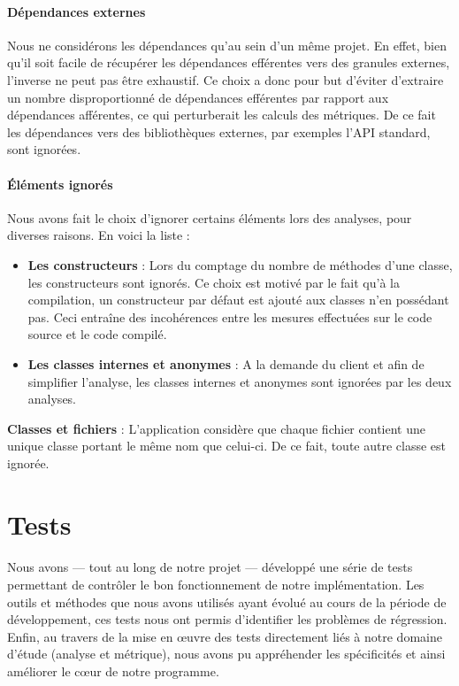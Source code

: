 \documentclass{scrartcl}
\begin{document}
        \paragraph{Dépendances externes}Nous ne considérons les dépendances qu'au sein d'un même projet. En effet, bien qu'il soit facile de récupérer les dépendances efférentes vers des granules externes, l'inverse ne peut pas être exhaustif. Ce choix a donc pour but d'éviter d'extraire un nombre disproportionné de dépendances efférentes par rapport aux dépendances afférentes, ce qui perturberait les calculs des métriques. De ce fait les dépendances vers des bibliothèques externes, par exemples l'API standard, sont ignorées.
        
        \paragraph{Éléments ignorés}Nous avons fait le choix d'ignorer certains éléments lors des analyses, pour diverses raisons. En voici la liste :
        \begin{itemize}
            \item \textbf{Les constructeurs} : Lors du comptage du nombre de méthodes d'une classe, les constructeurs sont ignorés. Ce choix est motivé par le fait qu'à la compilation, un constructeur par défaut est ajouté aux classes n'en possédant pas. Ceci entraîne des incohérences entre les mesures effectuées sur le code source et le code compilé.
            \item \textbf{Les classes internes et anonymes} : A la demande du client et afin de simplifier l'analyse, les classes internes et anonymes sont ignorées par les deux analyses.
        \end{itemize}
        \textbf{Classes et fichiers} : L'application considère que chaque fichier contient une unique classe portant le même nom que celui-ci. De ce fait, toute autre classe est ignorée.
        
\newpage
\section{Tests}
    \paragraph{}Nous avons — tout au long de notre projet — développé une série de tests permettant de contrôler le bon fonctionnement de notre implémentation. Les outils et méthodes que nous avons utilisés ayant évolué au cours de la période de développement, ces tests nous ont permis d'identifier les problèmes de régression. Enfin, au travers de la mise en œuvre des tests directement liés à notre domaine d’étude (analyse et métrique), nous avons pu appréhender les spécificités et ainsi améliorer le cœur de notre programme.
    
\end{document}
